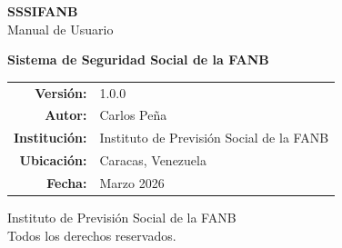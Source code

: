 \thispagestyle{plain}

\vspace*{3cm}

\begin{center}
    {\Huge \textbf{\textcolor{sandraDark}{SSSIFANB}}}\\[0.5cm]
    {\Large \textcolor{sandraGray}{Manual de Usuario}}\\[2cm]
    
    
    \vspace{1.5cm}
    
    {\large \textbf{Sistema de Seguridad Social de la FANB}}\\[3cm]
    
    \begin{minipage}{0.7\textwidth}
        \begin{tabular}{rl}
            \textbf{Versión:} & 1.0.0 \\[0.5em]
            \textbf{Autor:} & Carlos Peña \\[0.5em]
            \textbf{Institución:} & Instituto de Previsión Social de la FANB \\[0.5em]
            \textbf{Ubicación:} & Caracas, Venezuela \\[0.5em]
            \textbf{Fecha:} & Marzo 2026 \\
        \end{tabular}
    \end{minipage}
    
    \vspace{3cm}
    
\end{center}

\vfill

\begin{center}
    \small
    \textcolor{sandraGray}{
        Instituto de Previsión Social de la FANB\\
        Todos los derechos reservados.
    }
\end{center}
\cleardoublepage
